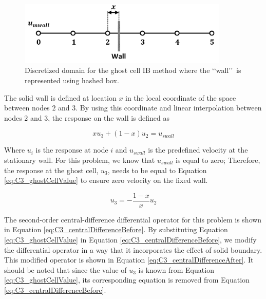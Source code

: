 \begin{figure}[H]
    \centering
    \includegraphics[width=10.00cm]{Chapter_3/figure/ghost_cell_discretization.png}
    \caption{Discretized domain for the ghost cell IB method where the \lq\lq wall\rq\rq\ is represented using hashed box.}
    \label{fig:C3_discretizedGhostCell}
\end{figure}

The solid wall is defined at location $x$ in the local coordinate of the space between nodes $2$ and $3$. By using this coordinate and linear interpolation between nodes $2$ and $3$, the response on the wall is defined as

\begin{equation}
    x u_3 + (1 - x) u_2 = u_{swall}
\end{equation}

Where $u_i$ is the response at node $i$ and $u_{swall}$ is the predefined velocity at the stationary wall. For this problem, we know that $u_{swall}$ is equal to zero; Therefore, the response at the ghost cell, $u_3$, needs to be equal to Equation \eqref{eq:C3_ghostCellValue} to ensure zero velocity on the fixed wall.

\begin{equation}\label{eq:C3_ghostCellValue}
    u_3 = -\frac{1 - x}{x} u_2
\end{equation}

The second-order central-difference differential operator for this problem is shown in Equation \eqref{eq:C3_centralDifferenceBefore}. By substituting Equation \eqref{eq:C3_ghostCellValue} in Equation \eqref{eq:C3_centralDifferenceBefore}, we modify the differential operator in a way that it incorporates the effect of solid boundary. This modified operator is shown in Equation \eqref{eq:C3_centralDifferenceAfter}. It should be noted that since the value of $u_3$ is known from Equation \eqref{eq:C3_ghostCellValue}, its corresponding equation is removed from Equation \eqref{eq:C3_centralDifferenceBefore}.

